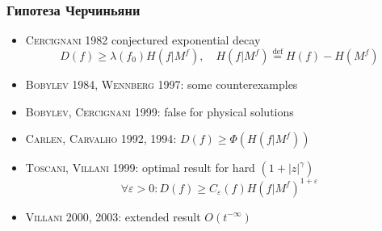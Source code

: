 \documentclass[mathserif]{beamer} %
\newcommand{\eqdef}{\overset{\mathrm{def}}{=}}
\newcommand{\OO}[1]{O(#1)}
\newcommand{\Cite}[2][]{\alert{\textsc{#2 #1}}}
\begin{document}
\begin{frame}
    \frametitle{Гипотеза Черчиньяни}
    \begin{itemize}
        \item \Cite[1982]{Cercignani} conjectured exponential decay
        \[ D(f) \geq \lambda(f_0) H(f|M^f), \quad  H(f|M^f) \eqdef H(f) - H(M^f) \]
        \item \Cite[1984]{Bobylev}, \Cite[1997]{Wennberg}: some counterexamples
        \item \Cite[1999]{Bobylev, Cercignani}: false for physical solutions
        \item \Cite[1992, 1994]{Carlen, Carvalho}: \( D(f) \geq \Phi(H(f|M^f)) \)
        \item \Cite[1999]{Toscani, Villani}: optimal result for hard \((1+|z|^\gamma)\)
        \[ \forall\varepsilon>0: D(f) \geq C_\varepsilon(f) H(f|M^f)^{1+\varepsilon}\]
        \item \Cite[2000, 2003]{Villani}: extended result \(\OO{t^{-\infty}}\)
    \end{itemize}
\end{frame}
\end{document}
